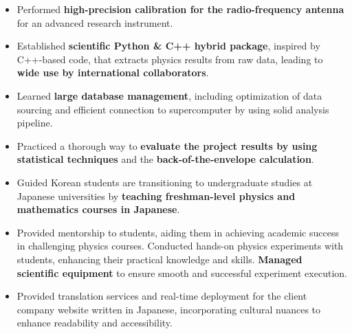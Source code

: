 \documentclass[10pt,a4paper,ragged2e,withhyper]{altacv}
\begin{document}
\begin{paracol}{2}

\begin{itemize}
\item Performed {\bf high-precision calibration for the radio-frequency antenna} for an advanced research instrument.
\item Established {\bf scientific Python \& C++ hybrid package}, inspired by C++-based code, that extracts physics results from raw data, leading to {\bf wide use by international collaborators}.
\item Learned {\bf large database management}, including optimization of data sourcing and efficient connection to supercomputer by using solid analysis pipeline.
\item Practiced a thorough way to {\bf evaluate the project results by using statistical techniques} and the {\bf back-of-the-envelope calculation}.
\end{itemize}
\divider

\begin{itemize}
\item Guided Korean students are transitioning to undergraduate studies at Japanese universities by {\bf teaching freshman-level physics and mathematics courses in Japanese}.
\item Provided mentorship to students, aiding them in achieving academic success in challenging physics courses. Conducted hands-on physics experiments with students, enhancing their practical knowledge and skills. {\bf Managed scientific equipment} to ensure smooth and successful experiment execution.
\end{itemize}
\divider

\begin{itemize}
\item Provided translation services and real-time deployment for the client company website written in Japanese, incorporating cultural nuances to enhance readability and accessibility.
\end{itemize}
\medskip





\end{paracol}
\end{document}
